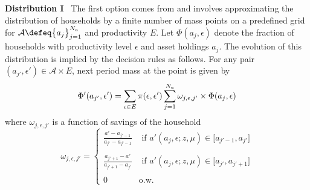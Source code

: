 \documentclass[a4paper,10pt]{article}  %
\begin{document}
\textbf{Distribution I} \
The first option comes from \citet{reiter} and involves approximating the distribution of households by a
finite number of mass points on a predefined grid for $ \mathcal{A} \defeq \big\{ a_j \big\}_{j=1}^{N_a} $ and productivity $E$.
Let $ \Phi( a_j, \epsilon ) $ denote the fraction of households with productivity level $ \epsilon $ and
asset holdings $ a_j $. The evolution of this distribution is implied by the decision rules as follows.
For any pair $ ( a_{j'}, \epsilon' ) \in \mathcal{A}\times E $, next period mass at the point is given by
\begin{equation}
   \Phi' ( a_{j'}, \epsilon' ) = \sum_{ \epsilon \in E } \pi( \epsilon, \epsilon' )
   \sum_{ j=1 }^{N_a}
   \omega_{j,\epsilon, j'}
   \times  \Phi(a_j, \epsilon) \\
\end{equation}
where $\omega_{j,\epsilon, j'}$ is a function of savings of the household
\begin{equation*}
   \label{eq:weight}
   \omega_{j,\epsilon, j'} = \begin{cases}
   \frac{ a' - a_{j'-1} }{ a_{j'} - a_{j'-1} } & \text{ if }
   a'( a_j, \epsilon ; z, \mu ) \in \Big[ a_{j'-1}, a_{j'} \Big] \\ \ & \ \\
   \frac{ a_{j'+1} - a' }{ a_{j'+1} - a_{j'} } & \text{ if }
   a'( a_j, \epsilon ; z , \mu) \in \Big[ a_{j'}, a_{j'+1} \Big] \\ \ & \ \\
   0 & \text{o.w.}
   \end{cases}
\end{equation*}
\end{document}
